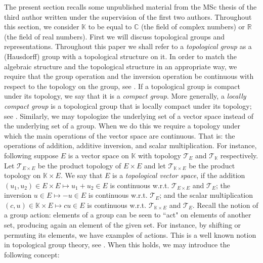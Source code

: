 \documentclass{amsart}
\theoremstyle{definition}
\numberwithin{equation}{section}
\newcommand{\C}{\mathbb{C}}
\newcommand{\R}{\mathbb{R}}
\newcommand{\K}{\mathbb{K}}
\begin{document}
The present section recalls some unpublished material from the MSc thesis of the third author \cite{ste} written under the supervision of the first two authors. Throughout this section, we consider $\K$ to be equal to $\C$ (the field of complex numbers) or $\R$ (the field of real numbers). First we will discuss topological groups and representations. Throughout this paper we shall refer to a \textit{topological group} as a (Hausdorff) group with a topological structure on it. In order to match the algebraic structure and the topological structure in an appropriate way, we require that the group operation and the inversion operation be continuous with respect to the topology on the group, see \cite[Definition 1.1]{hofmann}.  If a topological group is compact under its topology, we say that it is a \textit{compact group}. More generally, a \textit{locally compact group} is a topological group that is locally compact under its topology; see \cite{HHR, hofmann, stroppel, willard}. Similarly, we may topologize the underlying set of a vector space instead of the underlying set of a group. When we do this we require a topology under which the main operations of the vector space are continuous. That is: the operations of addition, additive inversion, and scalar multiplication. For instance, following \cite[Chapter 2]{hofmann} suppose $E$ is a vector space on $\K$ with topology $\mathcal{T}_E$ and $\mathcal{T}_{\K}$ respectively. Let $\mathcal{T}_{E \times E}$ be the product topology of $E \times E$ and let $\mathcal{T}_{\K \times E}$ be the product topology on $\K \times E$. We say that $E$ is a \textit{topological vector space}, if the addition $(u_1,u_2) \in E \times E \mapsto u_1 + u_2 \in E$ is continuous w.r.t. $\mathcal{T}_{E \times E}$ and $\mathcal{T}_E$; the inversion $u \in E \mapsto -u \in E$ is continuous w.r.t. $\mathcal{T}_E$;
and the scalar multiplication $(c,u) \in \K \times E \mapsto c u \in E$ is continuous w.r.t. $\mathcal{T}_{\K \times E}$ and $\mathcal{T}_E$. Recall the notion of a group action: elements of a group can be seen to ``act" on elements of another set, producing again an element of the given set. For instance, by shifting or permuting its elements, we have examples of actions. This is a well known notion in topological group theory, see \cite{HHR, hilgertneeb, hofmann,  stroppel}.
When this holds, we may introduce the following concept: 
\end{document}
